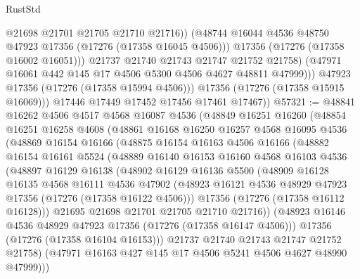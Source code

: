 \begin{lexlean}{RustStd}
\begin{coremodule}
                        @21698
                        @21701
                        @21705
                        @21710
                        @21716))
                    (@48744 @16044 @4536 @48750 @47923 @17356 (@17276 (@17358 @16045 @4506)))
                    @17356
                    (@17276 (@17358 @16002 @16051)))
                  @21737
                  @21740
                  @21743
                  @21747
                  @21752
                  @21758)
                (@47971 @16061 @442 @145 @17 @4506 @5300 @4506 @4627 @48811 @47999)))
            @47923
            @17356
            (@17276 (@17358 @15994 @4506)))
          @17356
          (@17276 (@17358 @15915 @16069)))
        @17446
        @17449
        @17452
        @17456
        @17461
        @17467))
@57321 := @48841
    @16262
    @4506
    @4517
    @4568
    @16087
    @4536
    (@48849
      @16251
      @16260
      (@48854
        @16251
        @16258
        @4608
        (@48861
          @16168
          @16250
          @16257
          @4568
          @16095
          @4536
          (@48869
            @16154
            @16166
            (@48875
              @16154
              @16163
              @4506
              @16166
              (@48882
                @16154
                @16161
                @5524
                (@48889
                  @16140
                  @16153
                  @16160
                  @4568
                  @16103
                  @4536
                  (@48897
                    @16129
                    @16138
                    (@48902
                      @16129
                      @16136
                      @5500
                      (@48909
                        @16128
                        @16135
                        @4568
                        @16111
                        @4536
                        @47902
                        (@48923 @16121 @4536 @48929 @47923 @17356 (@17276 (@17358 @16122 @4506)))
                        @17356
                        (@17276 (@17358 @16112 @16128)))
                      @21695
                      @21698
                      @21701
                      @21705
                      @21710
                      @21716))
                  (@48923 @16146 @4536 @48929 @47923 @17356 (@17276 (@17358 @16147 @4506)))
                  @17356
                  (@17276 (@17358 @16104 @16153)))
                @21737
                @21740
                @21743
                @21747
                @21752
                @21758)
              (@47971 @16163 @427 @145 @17 @4506 @5241 @4506 @4627 @48990 @47999)))

\end{coremodule}
\end{lexlean}
